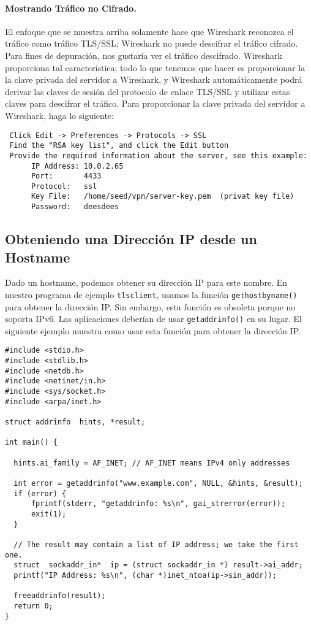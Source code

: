 \paragraph{Mostrando Tráfico no Cifrado.} El enfoque que se muestra arriba solamente
hace que Wireshark reconozca el tráfico como tráfico TLS/SSL; Wireshark no puede
descifrar el tráfico cifrado. Para fines de depuración, nos gustaría ver el tráfico descifrado.
Wireshark proporciona tal característica; todo lo que tenemos que hacer es proporcionar la
la clave privada del servidor a Wireshark, y Wireshark automáticamente
podrá derivar las claves de sesión del protocolo de enlace TLS/SSL y utilizar estas claves para descifrar el tráfico. 
Para proporcionar la clave privada del servidor a Wireshark, haga lo siguiente:

\begin{lstlisting}
 Click Edit -> Preferences -> Protocols -> SSL 
 Find the "RSA key list", and click the Edit button
 Provide the required information about the server, see this example:
      IP Address: 10.0.2.65
      Port:       4433
      Protocol:   ssl
      Key File:   /home/seed/vpn/server-key.pem  (privat key file)
      Password:   deesdees
\end{lstlisting}


\subsection{Obteniendo una Dirección IP desde un Hostname}
\label{vpn:subsec:hostnametoip}

Dado un hostname, podemos obtener su dirección IP para este nombre.
En nuestro programa de ejemplo \texttt{tlsclient}, usamos la función \texttt{gethostbyname()} para obtener la dirección IP. Sin embargo, esta función es obsoleta porque no soporta IPv6.
Las aplicaciones deberían de usar \texttt{getaddrinfo()} en su lugar. El siguiente ejemplo muestra como usar esta función para obtener la dirección IP.

\begin{lstlisting}
#include <stdio.h>
#include <stdlib.h>
#include <netdb.h>
#include <netinet/in.h>
#include <sys/socket.h>
#include <arpa/inet.h>

struct addrinfo  hints, *result;

int main() {

  hints.ai_family = AF_INET; // AF_INET means IPv4 only addresses

  int error = getaddrinfo("www.example.com", NULL, &hints, &result);
  if (error) {
      fprintf(stderr, "getaddrinfo: %s\n", gai_strerror(error));
      exit(1);
  }

  // The result may contain a list of IP address; we take the first one.
  struct  sockaddr_in*  ip = (struct sockaddr_in *) result->ai_addr;
  printf("IP Address: %s\n", (char *)inet_ntoa(ip->sin_addr));

  freeaddrinfo(result);
  return 0;
}
\end{lstlisting}
 



